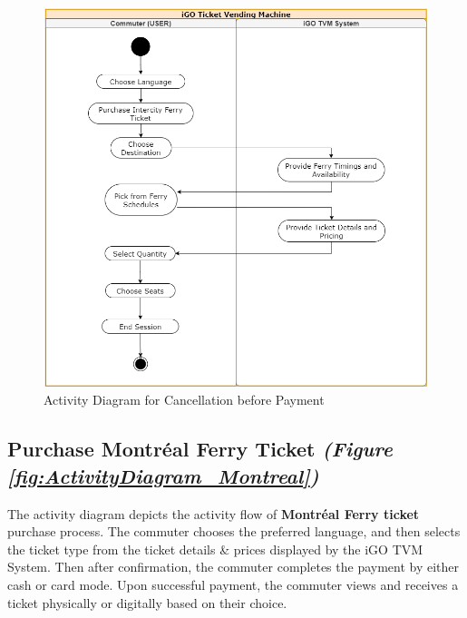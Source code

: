 \documentclass[letterpaper]{report}
\begin{document}
\begin{figure}[ht]
    \centering
    \includegraphics[width=\textwidth, height=0.73\textheight, keepaspectratio]{ActivityDiagrams/AD - 5.png}
    \caption{Activity Diagram for Cancellation before Payment}
    \label{fig:ActivityDiagram_Cancel}
\end{figure}
\clearpage

\subsection{Purchase Montréal Ferry Ticket \emph{(Figure \ref{fig:ActivityDiagram_Montreal})}}
The activity diagram depicts the activity flow of {\bf Montréal Ferry ticket} purchase process. The commuter chooses the preferred language, and then selects the ticket type from the ticket details \& prices displayed by the iGO TVM System. Then after confirmation, the commuter completes the payment by either cash or card mode. Upon successful payment, the commuter views and receives a ticket physically or digitally based on their choice. 
\vspace{\baselineskip}
\end{document}
